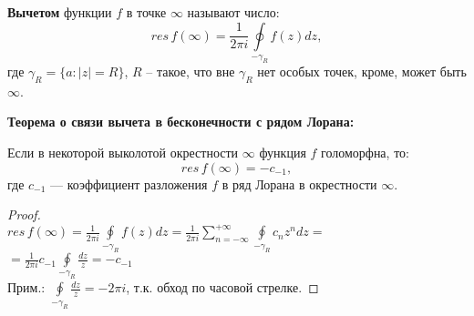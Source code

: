 \textbf{Вычетом} функции $f$ в точке $\infty$ называют число:
$$res\, f(\infty) = \frac{1}{2\pi i} \oint\limits_{-\gamma_R}f(z)dz,$$
где $\gamma_R=\{a: |z|=R\}$, $R$ -- такое, что вне $\gamma_R$ нет особых точек, кроме, может быть $\infty$.

\textbf{Теорема о связи вычета в бесконечности с рядом Лорана:}

Если в некоторой выколотой окрестности $\infty$ функция $f$ голоморфна, то:
$$res \, f(\infty) = -c_{-1},$$
где $c_{-1}$ --- коэффициент разложения $f$ в ряд Лорана в окрестности $\infty$.

\begin{proof}
    \ \\
    $res \, f(\infty) =\frac{1}{2\pi i} \oint\limits_{-\gamma_R} f(z)dz = \frac{1}{2\pi i}\sum_{n=-\infty}^{+\infty} \oint\limits_{-\gamma_R}c_n z^n dz =$\\
    $= \frac{1}{2\pi i}c_{-1} \oint\limits_{-\gamma_R} \frac{dz}{z} = -c_{-1}$\\
    Прим.: $ \oint\limits_{-\gamma_R} \frac{dz}{z} = -2\pi i$, т.к. обход по часовой стрелке.
\end{proof}